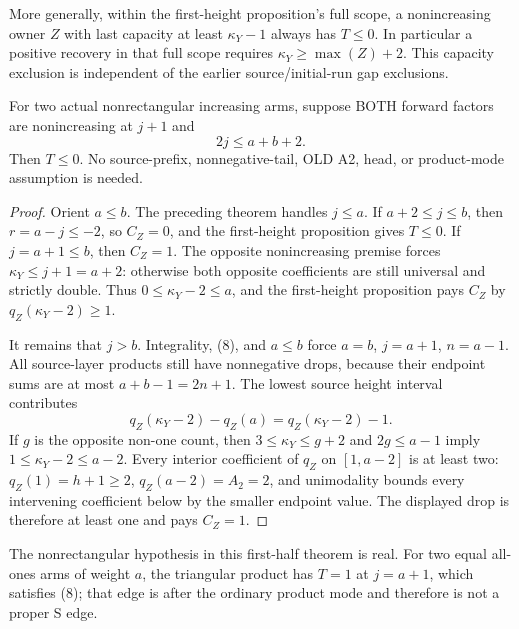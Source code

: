 More generally, within the first-height proposition's full scope,
a nonincreasing owner $Z$ with last capacity at least
$\kappa_Y-1$ always has $T\le0$. In particular a positive
recovery in that full scope requires
$\kappa_Y\ge\max(Z)+2$. This capacity exclusion is independent
of the earlier source/initial-run gap exclusions.

\begin{theorem}
For two actual nonrectangular increasing arms, suppose BOTH forward
factors are nonincreasing at $j+1$ and
\[
                             2j\le a+b+2.           \tag{8}
\]
Then $T\le0$. No source-prefix, nonnegative-tail, OLD A2,
head, or product-mode assumption is needed.
\end{theorem}
\begin{proof}
Orient $a\le b$. The preceding theorem handles $j\le a$.
If $a+2\le j\le b$, then $r=a-j\le-2$, so $C_Z=0$,
and the first-height proposition gives $T\le0$.
If $j=a+1\le b$, then $C_Z=1$. The opposite nonincreasing
premise forces $\kappa_Y\le j+1=a+2$: otherwise both opposite
coefficients are still universal and strictly double.
Thus $0\le\kappa_Y-2\le a$, and the first-height proposition
pays $C_Z$ by $q_Z(\kappa_Y-2)\ge1$.

It remains that $j>b$. Integrality, (8), and $a\le b$ force
$a=b$, $j=a+1$, $n=a-1$. All source-layer products still
have nonnegative drops, because their endpoint sums are at most
$a+b-1=2n+1$. The lowest source height interval contributes
\[
 q_Z(\kappa_Y-2)-q_Z(a)=q_Z(\kappa_Y-2)-1.
\]
If $g$ is the opposite non-one count, then
$3\le\kappa_Y\le g+2$ and $2g\le a-1$ imply
$1\le\kappa_Y-2\le a-2$.
Every interior coefficient of $q_Z$ on $[1,a-2]$ is at
least two: $q_Z(1)=h+1\ge2$, $q_Z(a-2)=A_2=2$, and
unimodality bounds every intervening coefficient below by
the smaller endpoint value. The displayed drop is therefore
at least one and pays $C_Z=1$.
\end{proof}

The nonrectangular hypothesis in this first-half theorem is real.
For two equal all-ones arms of weight $a$, the triangular product
has $T=1$ at $j=a+1$, which satisfies (8); that edge is after
the ordinary product mode and therefore is not a proper S edge.

